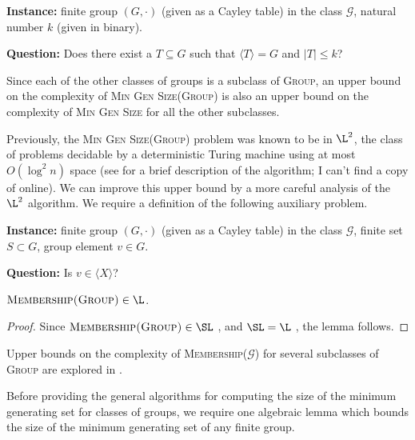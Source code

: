 \documentclass{article}
\newcommand{\gen}[1]{{\langle #1 \rangle}}
\begin{document}
\begin{definition}
  \mbox{}

  \textbf{Instance:} finite group $(G, \cdot)$ (given as a Cayley table) in the class $\mathcal{G}$, natural number $k$ (given in binary).

  \textbf{Question:} Does there exist a $T \subseteq G$ such that $\gen{T} = G$ and $|T| \leq k$?
\end{definition}

Since each of the other classes of groups is a subclass of \textsc{Group}, an upper bound on the complexity of \textsc{Min Gen Size(Group)} is also an upper bound on the complexity of \textsc{Min Gen Size} for all the other subclasses.

Previously, the \textsc{Min Gen Size(Group)} problem was known to be in $\L^2$, the class of problems decidable by a deterministic Turing machine using at most $O(\log^2 n)$ space \cite{lsz77} (see \cite[Proposition~3]{at06} for a brief description of the algorithm; I can't find a copy of \cite{lsz77} online).
We can improve this upper bound by a more careful analysis of the $\L^2$ algorithm.
We require a definition of the following auxiliary problem.

\begin{definition}
  \mbox{}

  \textbf{Instance:} finite group $(G, \cdot)$ (given as a Cayley table) in the class $\mathcal{G}$, finite set $S \subset G$, group element $v \in G$.

  \textbf{Question:} Is $v \in \gen{X}$?
\end{definition}

\begin{lemma}\label{lem:membershipinl}
  $\textsc{Membership(Group)} \in \L$.
\end{lemma}
\begin{proof}
  Since $\textsc{Membership(Group)} \in \SL$ \cite[Section~3]{bm89}, and $\SL = \L$ \cite{reingold08}, the lemma follows.
\end{proof}

Upper bounds on the complexity of \textsc{Membership($\mathcal{G}$)} for several subclasses of \textsc{Group} are explored in \cite{bklm01}.

Before providing the general algorithms for computing the size of the minimum generating set for classes of groups, we require one algebraic lemma which bounds the size of the minimum generating set of any finite group.
\end{document}
